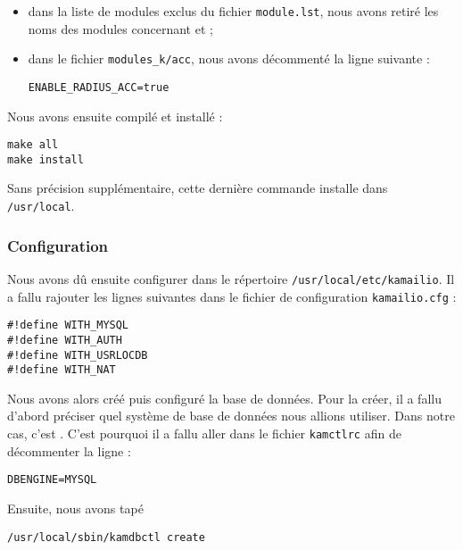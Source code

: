 \begin{itemize}
	\item{dans la liste de modules exclus du fichier \texttt{module.lst}, nous avons retiré les noms des modules concernant {\my} et {\rad}} ;
	\item{dans le fichier \texttt{modules\_k/acc}, nous avons décommenté la ligne suivante :
\begin{verbatim}
ENABLE_RADIUS_ACC=true
\end{verbatim}}
\end{itemize}

Nous avons ensuite compilé et installé {\kam} :

\begin{verbatim}
make all
make install
\end{verbatim}

Sans précision supplémentaire, cette dernière commande installe {\kam} dans \texttt{/usr/local}.

\subsubsection{Configuration}

Nous avons dû ensuite configurer {\kam} dans le répertoire \texttt{/usr/local/etc/kamailio}. Il a fallu rajouter les lignes suivantes dans le fichier de configuration \texttt{kamailio.cfg} :

\begin{verbatim}
#!define WITH_MYSQL
#!define WITH_AUTH
#!define WITH_USRLOCDB
#!define WITH_NAT
\end{verbatim}

Nous avons alors créé puis configuré la base de données. Pour la créer, il a fallu d'abord préciser quel système de base de données nous allions utiliser. Dans notre cas, c'est \my. C'est pourquoi il a fallu aller dans le fichier \texttt{kamctlrc} afin de décommenter la ligne :

\begin{verbatim}
DBENGINE=MYSQL
\end{verbatim}

Ensuite, nous avons tapé 
\begin{verbatim}
/usr/local/sbin/kamdbctl create
\end{verbatim}
\todo
